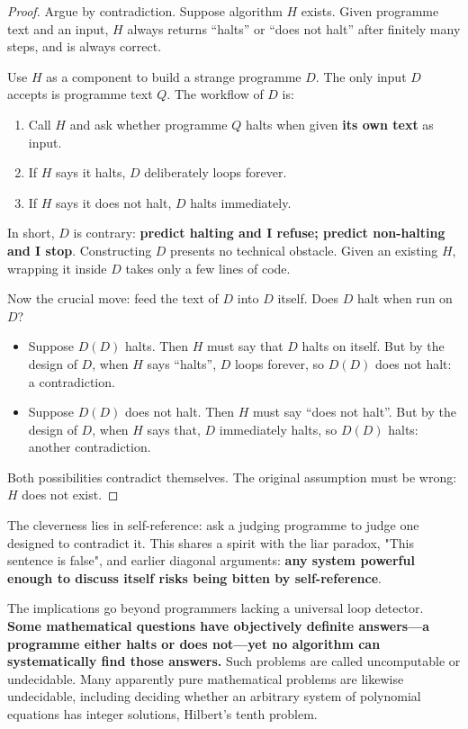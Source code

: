 \begin{proof}
Argue by contradiction. Suppose algorithm $H$ exists. Given programme text and an input, $H$ always returns ``halts'' or ``does not halt'' after finitely many steps, and is always correct.

Use $H$ as a component to build a strange programme $D$. The only input $D$ accepts is programme text $Q$. The workflow of $D$ is:

\begin{enumerate}
\item Call $H$ and ask whether programme $Q$ halts when given \textbf{its own text} as input.
\item If $H$ says it halts, $D$ deliberately loops forever.
\item If $H$ says it does not halt, $D$ halts immediately.
\end{enumerate}

In short, $D$ is contrary: \textbf{predict halting and I refuse; predict non-halting and I stop}. Constructing $D$ presents no technical obstacle. Given an existing $H$, wrapping it inside $D$ takes only a few lines of code.

Now the crucial move: feed the text of $D$ into $D$ itself. Does $D$ halt when run on $D$?

\begin{itemize}
\item Suppose $D(D)$ halts. Then $H$ must say that $D$ halts on itself. But by the design of $D$, when $H$ says ``halts'', $D$ loops forever, so $D(D)$ does not halt: a contradiction.
\item Suppose $D(D)$ does not halt. Then $H$ must say ``does not halt''. But by the design of $D$, when $H$ says that, $D$ immediately halts, so $D(D)$ halts: another contradiction.
\end{itemize}

Both possibilities contradict themselves. The original assumption must be wrong: $H$ does not exist.
\end{proof}

The cleverness lies in self-reference: ask a judging programme to judge one designed to contradict it. This shares a spirit with the liar paradox, "This sentence is false", and earlier diagonal arguments: \textbf{any system powerful enough to discuss itself risks being bitten by self-reference}.

The implications go beyond programmers lacking a universal loop detector. \textbf{Some mathematical questions have objectively definite answers---a programme either halts or does not---yet no algorithm can systematically find those answers.} Such problems are called uncomputable or undecidable. Many apparently pure mathematical problems are likewise undecidable, including deciding whether an arbitrary system of polynomial equations has integer solutions, Hilbert's tenth problem.


